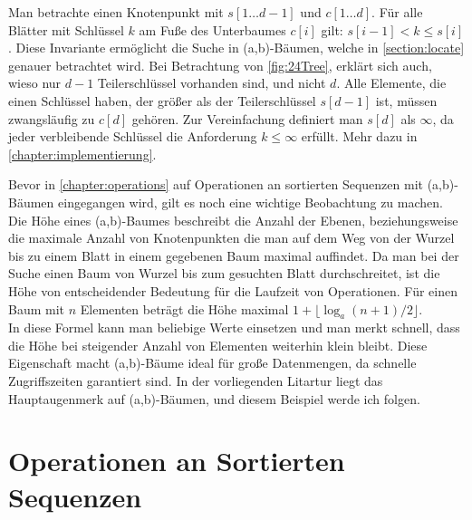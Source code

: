 Man betrachte einen Knotenpunkt mit $s[1 \dots d-1]$ und $c[1 \dots d]$. Für alle Blätter mit Schlüssel $k$ am Fuße des Unterbaumes $c[i]$ gilt: $s[i-1] < k \leq s[i]$. Diese Invariante ermöglicht die Suche in (a,b)-Bäumen, welche in \autoref{section:locate} genauer betrachtet wird. Bei Betrachtung von \autoref{fig:24Tree}, erklärt sich auch, wieso nur $d-1$ Teilerschlüssel vorhanden sind, und nicht $d$. Alle Elemente, die einen Schlüssel haben, der größer als der Teilerschlüssel $s[d-1]$ ist, müssen zwangsläufig zu $c[d]$ gehören. Zur Vereinfachung definiert man $s[d]$ als $\infty$, da jeder verbleibende Schlüssel die Anforderung $k \leq \infty$ erfüllt. Mehr dazu in \autoref{chapter:implementierung}.
\par
Bevor in \autoref{chapter:operations} auf Operationen an sortierten Sequenzen mit (a,b)-Bäumen eingegangen wird, gilt es noch eine wichtige Beobachtung zu machen. Die Höhe eines (a,b)-Baumes beschreibt die Anzahl der Ebenen, beziehungsweise die maximale Anzahl von Knotenpunkten die man auf dem Weg von der Wurzel bis zu einem Blatt in einem gegebenen Baum maximal auffindet. Da man bei der Suche einen Baum von Wurzel bis zum gesuchten Blatt durchschreitet, ist die Höhe von entscheidender Bedeutung für die Laufzeit von Operationen. Für einen Baum mit $n$ Elementen beträgt die Höhe maximal $1+ \lfloor \log_{a}(n+1)/2 \rfloor$. \cite{Sanders:19}
\\
In diese Formel kann man beliebige Werte einsetzen und man merkt schnell, dass die Höhe bei steigender Anzahl von Elementen weiterhin klein bleibt. Diese Eigenschaft macht (a,b)-Bäume ideal für große Datenmengen, da schnelle Zugriffszeiten garantiert sind. In der vorliegenden Litartur liegt das Hauptaugenmerk auf (a,b)-Bäumen, und diesem Beispiel werde ich folgen.



\chapter{Operationen an Sortierten Sequenzen}
\label{chapter:operations}


